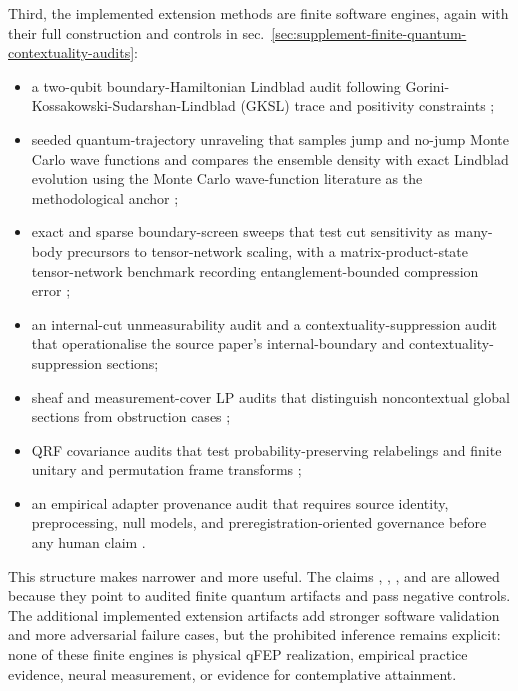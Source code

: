 \documentclass[
]{article}
\newcounter{none} %
\providecommand{\tightlist}{%
  \setlength{\itemsep}{0pt}\setlength{\parskip}{0pt}}
\begin{document}
Third, the implemented extension methods are finite software engines,
again with their full construction and controls in
sec.~\ref{sec:supplement-finite-quantum-contextuality-audits}:

\begin{itemize}
\tightlist
\item
  a two-qubit boundary-Hamiltonian Lindblad audit following
  Gorini-Kossakowski-Sudarshan-Lindblad (GKSL) trace and positivity
  constraints
  \citep{gorini1976completelypositive, lindblad1976generators, manzano2020lindblad};
\item
  seeded quantum-trajectory unraveling that samples jump and no-jump
  Monte Carlo wave functions and compares the ensemble density with
  exact Lindblad evolution using the Monte Carlo wave-function
  literature as the methodological anchor
  \citep{dalibard1992wavefunction, molmer1993montecarlo, plenio1998quantumjump, wiseman2010quantum};
\item
  exact and sparse boundary-screen sweeps that test cut sensitivity as
  many-body precursors to tensor-network scaling, with a
  matrix-product-state tensor-network benchmark recording
  entanglement-bounded compression error
  \citep{eisert2010area, orus2014tensor};
\item
  an internal-cut unmeasurability audit and a contextuality-suppression
  audit that operationalise the source paper's internal-boundary and
  contextuality-suppression sections;
\item
  sheaf and measurement-cover LP audits that distinguish noncontextual
  global sections from obstruction cases
  \citep{kochen1967problem, abramsky2011sheaf};
\item
  QRF covariance audits that test probability-preserving relabelings and
  finite unitary and permutation frame transforms
  \citep{giacomini2019qrf, vanrietvelde2020perspective, hoehn2021trinity, bartlett2007reference};
\item
  an empirical adapter provenance audit that requires source identity,
  preprocessing, null models, and preregistration-oriented governance
  before any human claim
  \citep{wilkinson2016fair, nosek2018preregistration}.
\end{itemize}

This structure makes  narrower and more
useful. The claims ,
,
, and
 are allowed because they point
to audited finite quantum artifacts and pass negative controls. The
additional implemented extension artifacts add stronger software
validation and more adversarial failure cases, but the prohibited
inference remains explicit: none of these finite engines is physical
qFEP realization, empirical practice evidence, neural measurement, or
evidence for contemplative attainment.
\end{document}
